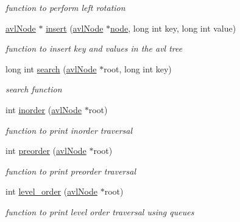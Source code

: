 \begin{DoxyCompactItemize}
\begin{DoxyCompactList}\small\item\em function to perform left rotation \end{DoxyCompactList}\item 
\hyperlink{namespace_a_v_ltree_a563d9b152f0d58a69308eeec8d716882}{avl\-Node} $\ast$ \hyperlink{class_a_v_ltree_1_1avl_tree_a8c9723e930fb1ebc4d69a5403435db7e}{insert} (\hyperlink{namespace_a_v_ltree_a563d9b152f0d58a69308eeec8d716882}{avl\-Node} $\ast$\hyperlink{class_a_v_ltree_1_1node}{node}, long int key, long int value)
\begin{DoxyCompactList}\small\item\em function to insert key and values in the avl tree \end{DoxyCompactList}\item 
long int \hyperlink{class_a_v_ltree_1_1avl_tree_ae6483fbc45a6e04b8a55981061d1a7fa}{search} (\hyperlink{namespace_a_v_ltree_a563d9b152f0d58a69308eeec8d716882}{avl\-Node} $\ast$root, long int key)
\begin{DoxyCompactList}\small\item\em search function \end{DoxyCompactList}\item 
int \hyperlink{class_a_v_ltree_1_1avl_tree_a8796ffd740e06d2759d28818af1d773d}{inorder} (\hyperlink{namespace_a_v_ltree_a563d9b152f0d58a69308eeec8d716882}{avl\-Node} $\ast$root)
\begin{DoxyCompactList}\small\item\em function to print inorder traversal \end{DoxyCompactList}\item 
int \hyperlink{class_a_v_ltree_1_1avl_tree_aa0ca6825ce7f649d849b65e96a56663a}{preorder} (\hyperlink{namespace_a_v_ltree_a563d9b152f0d58a69308eeec8d716882}{avl\-Node} $\ast$root)
\begin{DoxyCompactList}\small\item\em function to print preorder traversal \end{DoxyCompactList}\item 
int \hyperlink{class_a_v_ltree_1_1avl_tree_a17888ed72d05c478e39dbf4bc64953b8}{level\-\_\-order} (\hyperlink{namespace_a_v_ltree_a563d9b152f0d58a69308eeec8d716882}{avl\-Node} $\ast$root)
\begin{DoxyCompactList}\small\item\em function to print level order traversal using queues \end{DoxyCompactList}\end{DoxyCompactItemize}


